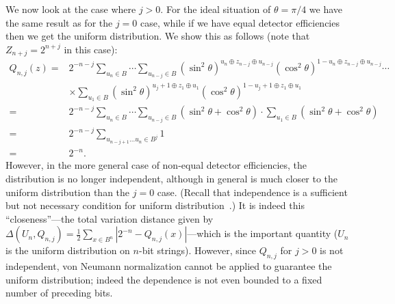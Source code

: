 \documentclass[%
 preprint,
 showpacs,
 showkeys,
 preprintnumbers,
  amsmath,amssymb,
  aps,
 pra,
  longbibliography,
  floatfix,
 ]{revtex4-1}
\theoremstyle{definition}
\begin{document}
We now look at the case where $j>0$. For the ideal situation of $\theta=\pi/4$ we have the same result as for the $j=0$ case, while if we have equal detector efficiencies then we get the uniform distribution. We show this as follows (note that $Z_{n+j}=2^{n+j}$ in this case):
\begin{align*}
	Q_{n,j}(z) =& 2^{-n-j}\sum_{u_n\in B}\cdots \sum_{u_{n-j}\in B}(\sin^2\theta)^{u_n \oplus z_{n-j}\oplus u_{n-j}}(\cos^2\theta)^{1-u_n \oplus z_{n-j}\oplus u_{n-j}}\cdots\\&\times \sum_{u_1 \in B} (\sin^2\theta)^{u_j+1 \oplus z_{1}\oplus u_{1}}(\cos^2\theta)^{1-u_j+1 \oplus z_{1}\oplus u_{1}}\\
	=& 2^{-n-j}\sum_{u_n\in B}\cdots \sum_{u_{n-j}\in B}(\sin^2\theta + \cos^2\theta)\cdot \sum_{u_1 \in B}(\sin^2\theta + \cos^2\theta)\\
	=& 2^{-n-j}\sum_{u_{n-j+1}\dots u_n \in B^j}1\\
	=& 2^{-n}.
\end{align*}
However, in the more general case of non-equal detector efficiencies, the distribution is no longer independent, although in general is much closer to the uniform distribution than the $j=0$ case.
(Recall that independence is a sufficient but not necessary condition for uniform distribution~\cite{AbbottCalude10}.) It is indeed this ``closeness''---the total variation distance given by $\Delta(U_n,Q_{n,j}) = \frac{1}{2}\sum_{x\in B^n}|2^{-n} - Q_{n,j}(x)|$---which is the important quantity ($U_n$ is the uniform distribution on $n$-bit strings). However, since $Q_{n,j}$ for $j>0$ is not independent, von Neumann normalization cannot be applied to guarantee the uniform distribution; indeed the dependence is not even bounded to a fixed number of preceding bits.
\end{document}
